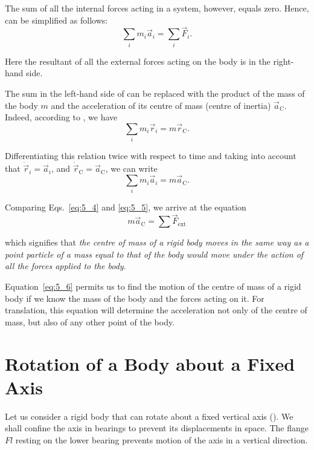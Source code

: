 \noindent
The sum of all the internal forces acting in a system, however, equals zero. Hence,  can be simplified as follows:
\begin{equation}\label{eq:5_4}
	\sum_i m_i\vec{a}_i = \sum_i \vec{F}_i.
\end{equation}

\noindent
Here the resultant of all the external forces acting on the body is in the right-hand side.

The sum in the left-hand side of  can be replaced with the product of the mass of the body $m$ and the acceleration of its centre of mass (centre of inertia) $\vec{a}_{\text{C}}$. Indeed, according to , we have
\begin{equation*}
	\sum_i m_i\vec{r}_i = m \vec{r}_{\text{C}}.
\end{equation*}

\noindent
Differentiating this relation twice with respect to time and taking into account that $\ddot{\vec{r}}_i=\vec{a}_i$, and $\ddot{\vec{r}}_{\text{C}}=\vec{a}_{\text{C}}$, we can write
\begin{equation}\label{eq:5_5}
	\sum_i m_i\vec{a}_i = m \vec{a}_{\text{C}}.
\end{equation}

Comparing Eqs.~\eqref{eq:5_4} and \eqref{eq:5_5}, we arrive at the equation
\begin{equation}\label{eq:5_6}
	m \vec{a}_{\text{C}} = \sum\vec{F}_{\text{ext}}
\end{equation}

\noindent
which signifies that \textit{the centre of mass of a rigid body moves in the same way as a point particle of a mass equal to that of the body would move under the action of all the forces applied to the body}.

Equation~\eqref{eq:5_6} permits us to find the motion of the centre of mass of a rigid body if we know the mass of the body and the forces acting on it. For translation, this equation will determine the acceleration not only of the centre of mass, but also of any other point of the body.

\section{Rotation of a Body about a Fixed Axis}\label{sec:5_3}

Let us consider a rigid body that can rotate about a fixed vertical axis (). We shall confine the axis in bearings to prevent its displacements in space. The flange $Fl$ resting on the lower bearing prevents motion of the axis in a vertical direction.


